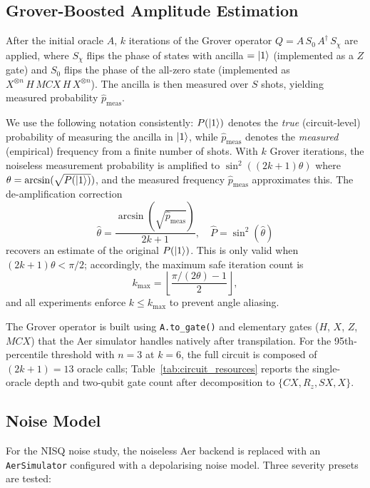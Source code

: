 \documentclass[11pt,a4paper]{article}
\begin{document}
\subsection{Grover-Boosted Amplitude Estimation}

After the initial oracle $A$, $k$ iterations of the Grover operator $Q = A\, S_0\, A^\dagger\, S_\chi$ are applied, where $S_\chi$ flips the phase of states with ancilla $= \ket{1}$ (implemented as a $Z$ gate) and $S_0$ flips the phase of the all-zero state (implemented as $X^{\otimes n}\, H\, MCX\, H\, X^{\otimes n}$). The ancilla is then measured over $S$ shots, yielding measured probability $\hat{p}_{\text{meas}}$.

We use the following notation consistently: $P(\ket{1})$ denotes the \emph{true} (circuit-level) probability of measuring the ancilla in $\ket{1}$, while $\hat{p}_{\text{meas}}$ denotes the \emph{measured} (empirical) frequency from a finite number of shots. With $k$ Grover iterations, the noiseless measurement probability is amplified to $\sin^2((2k+1)\theta)$ where $\theta = \arcsin(\sqrt{P(\ket{1})})$, and the measured frequency $\hat{p}_{\text{meas}}$ approximates this. The de-amplification correction
\begin{equation}
\hat{\theta} = \frac{\arcsin(\sqrt{\hat{p}_{\text{meas}}})}{2k+1}, \quad \hat{P} = \sin^2(\hat{\theta})
\label{eq:deamp}
\end{equation}
recovers an estimate of the original $P(\ket{1})$. This is only valid when $(2k+1)\theta < \pi/2$; accordingly, the maximum safe iteration count is
\begin{equation}
k_{\max} = \left\lfloor \frac{\pi/(2\theta) - 1}{2} \right\rfloor,
\label{eq:kmax}
\end{equation}
and all experiments enforce $k \leq k_{\max}$ to prevent angle aliasing.

The Grover operator is built using \texttt{A.to\_gate()} and elementary gates ($H$, $X$, $Z$, $MCX$) that the Aer simulator handles natively after transpilation. For the 95th-percentile threshold with $n=3$ at $k=6$, the full circuit is composed of $(2k+1) = 13$ oracle calls; Table~\ref{tab:circuit_resources} reports the single-oracle depth and two-qubit gate count after decomposition to $\{CX, R_z, SX, X\}$.

\subsection{Noise Model}

For the NISQ noise study, the noiseless Aer backend is replaced with an \texttt{AerSimulator} configured with a depolarising noise model. Three severity presets are tested:
\end{document}
